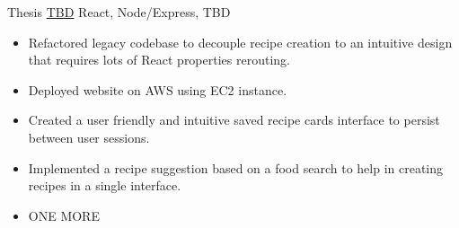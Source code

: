 \begin{entrylist}

\entry
{Thesis}
{\href{https://narrativescience.com/}{TBD}}
{React, Node/Express, TBD}
{\begin{itemize}
\item Refactored legacy codebase to decouple recipe creation to an intuitive design that requires lots of React properties rerouting.
\item  Deployed website on AWS using EC2 instance.
\item  Created a user friendly and intuitive saved recipe cards interface to persist between user sessions. 
\item Implemented a recipe suggestion based on a food search to help in creating recipes in a single interface. 
\item ONE MORE
\end{itemize}}

\end{entrylist}
